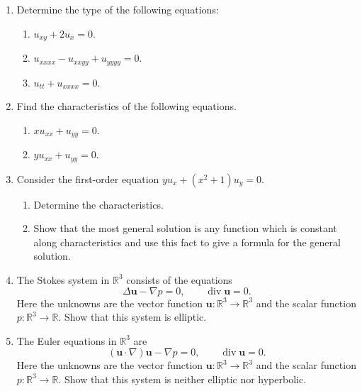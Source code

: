 \begin{enumerate}[label=\thesection.\arabic*.,ref=\thesection.\arabic*,start=1,series=book-problems]

\item\label{ex:determine-pde-types} Determine the type of the following equations:\begin{enumerate}[label=(\alph*)]
\item $u_{xy}+2u_x=0$.
\item $u_{xxxx}-u_{xxyy}+u_{yyyy}=0$.
\item $u_{tt}+u_{xxxx}=0$.
\end{enumerate}

\item\label{ex:find-second-order-characteristics} Find the characteristics of the following equations.\begin{enumerate}[label=(\alph*)]
\item $xu_{xx}+u_{yy}=0$.
\item $yu_{xx}+u_{yy}=0$.
\end{enumerate}

\item\label{ex:first-order-characteristic-solution} Consider the first-order equation $yu_x+(x^2+1)u_y=0$.
\begin{enumerate}[label=(\alph*)]
\item Determine the characteristics.
\item Show that the most general solution is any function which is constant along characteristics and use this fact to give a formula for the general solution.
\end{enumerate}

\item\label{ex:stokes-ellipticity} The Stokes system in $\mathbb{R}^3$ consists of the equations
\begin{equation}\label{eq:classification-stokes-system}
\Delta\bm{u}-\nabla p=0,\qquad\operatorname{div}\bm{u}=0.
\end{equation}
Here the unknowns are the vector function $\bm{u}:\mathbb{R}^3\to\mathbb{R}^3$ and the scalar function $p:\mathbb{R}^3\to\mathbb{R}$. Show that this system is elliptic.

\item\label{ex:euler-system-type} The Euler equations in $\mathbb{R}^3$ are
\begin{equation}\label{eq:classification-euler-system}
(\bm{u}\cdot\nabla)\bm{u}-\nabla p=0,\qquad\operatorname{div}\bm{u}=0.
\end{equation}
Here the unknowns are the vector function $\bm{u}:\mathbb{R}^3\to\mathbb{R}^3$ and the scalar function $p:\mathbb{R}^3\to\mathbb{R}$. Show that this system is neither elliptic nor hyperbolic.


\end{enumerate}
